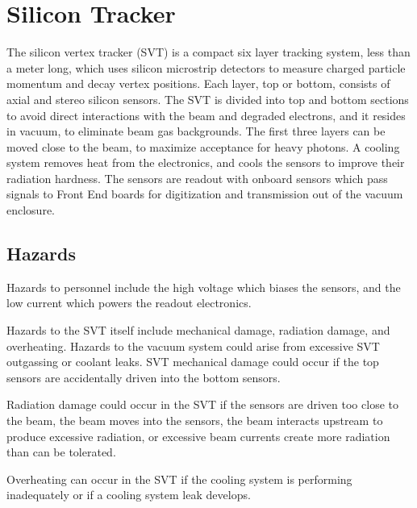 \graphicspath{{hps/figs/}}
\renewcommand{\dirfig}[0]{hps/figs}
\renewcommand{\dircur}[0]{hps}


\section{Silicon Tracker}
\indent

The silicon vertex tracker (SVT) is a compact six layer tracking system, less than a meter long, which uses silicon microstrip detectors to measure charged particle momentum and decay vertex positions. Each layer, top or bottom, consists of axial and stereo silicon sensors. The SVT  is divided into top and bottom sections  to avoid direct interactions with the beam and degraded electrons, and it resides in vacuum, to eliminate beam gas backgrounds. The first three layers can be moved close to the beam, to maximize acceptance for heavy photons. A cooling system removes heat from the electronics, and cools the sensors to improve their radiation hardness.  The sensors are readout with onboard sensors which pass signals to Front End boards for digitization and transmission out of the vacuum enclosure.

\subsection{Hazards} 
\indent

Hazards to personnel include the high voltage which biases the sensors, and the low current which powers the readout electronics.

Hazards to the SVT itself include mechanical damage, radiation damage, and overheating. Hazards to the vacuum system could arise from excessive SVT outgassing or coolant leaks.
SVT mechanical damage could occur if the top sensors are accidentally driven into the bottom sensors.

Radiation damage could occur in the SVT  if the sensors are driven too close to the beam, the beam moves into the sensors, the beam interacts upstream to produce excessive radiation, or excessive beam currents create more radiation than can be tolerated.

Overheating can occur in the SVT  if the cooling system is performing inadequately or if a cooling system leak develops.

